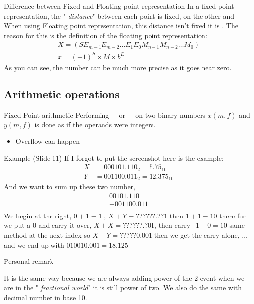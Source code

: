 
\begin{parag}{Difference between Fixed and Floating point representation}
    In a fixed point representation, the " \textit{distance}" between each point is fixed, on the other and When using Floating point representation, this distance isn't fixed it is . The reason for this is the definition of the floating point representation:
    \begin{align*}
        X = (SE_{m-1}E_{m-2} \dots E_1 E_0 M_{n-1}M_{n-2} \dots M_0) \\
        x = (-1)^S \times M \times b^E
    \end{align*}
    As you can see, the number can be much more precise as it goes near zero.
\end{parag}

\subsection{Arithmetic operations}
\begin{parag}{Fixed-Point arithmetic}
    Performing $+$ or $-$ on two binary numbers $x(m, f)$ and $y(m, f)$ is done  as if the operands were integers.
    \begin{itemize}
        \item Overflow can happen
    \end{itemize}

    \begin{subparag}{Example}
        (Slide 11) 
        If I forgot to put the screenshot here is the example:
        \\
        \begin{align*}
            X &= 000101.110_2 = 5.75_{10} \\
            Y &= 001100.011_2 = 12.375_{10}
        \end{align*}
        And we want to sum up these two number, 
        \begin{align*}
            00101.110 \\
         +   001100.011 \\
        \end{align*}
        We begin at the right, $0 + 1 = 1$ , $X + Y = ??????.??1$ then $1 + 1 = 10$ there for we put a $0$ and carry it over, $X + X = ??????.?01$, then carry$ + 1 + 0 = 10$ same method at the next index so $X + Y = ?????0.001$ then we get the carry alone, $ \dots$ and we end up with $010010.001 = 18.125$
    \end{subparag}

    \begin{subparag}{Personal remark}
        \begin{framedremark}
            It is the same way because we are always adding power of the $2$ event when we are in the " \textit{fractional world}" it is still power of two. We also do the same with decimal number in base 10.
        \end{framedremark}
    \end{subparag}
\end{parag}

